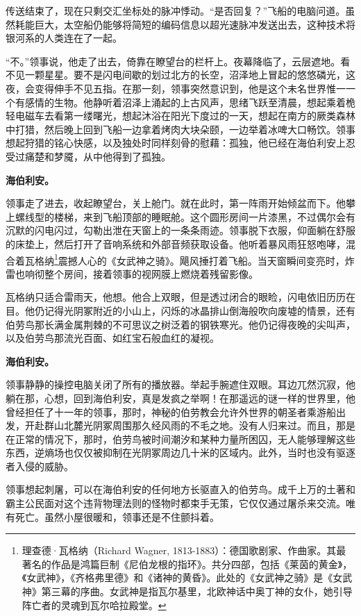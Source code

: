 \documentclass[AutoFakeBold=true]{book}
\begin{document}
传送结束了，现在只剩交汇坐标处的脉冲悸动。``是否回复？''飞船的电脑问道。虽然耗能巨大，太空船仍能够将简短的编码信息以超光速脉冲发送出去，这种技术将银河系的人类连在了一起。

``不。''领事说，他走了出去，倚靠在瞭望台的栏杆上。夜幕降临了，云层遮地。看不见一颗星星。要不是闪电间歇的划过北方的长空，沼泽地上冒起的悠悠磷光，这夜，会变得伸手不见五指。在那一刻，领事突然意识到，他是这个未名世界惟一一个有感情的生物。他静听着沼泽上涌起的上古风声，思绪飞跃至清晨，想起乘着桅轻电磁车去看第一缕曙光，想起沐浴在阳光下度过的一天，想起在南方的厥类森林中打猎，然后晚上回到飞船一边拿着烤肉大块朵颐，一边举着冰啤大口畅饮。领事想起狩猎的铭心快感，以及独处时同样刻骨的慰藉：孤独，他已经在海伯利安上忍受过痛楚和梦魇，从中他得到了孤独。

{\bf \kaishu 海伯利安。}

领事走了进去，收起瞭望台，关上舱门。就在此时，第一阵雨开始倾盆而下。他攀上螺线型的楼梯，来到飞船顶部的睡眠舱。这个圆形房间一片漆黑，不过偶尔会有沉默的闪电闪过，勾勒出泄在天窗上的一条条雨迹。领事脱下衣服，仰面躺在舒服的床垫上，然后打开了音响系统和外部音频获取设备。他听着暴风雨狂怒咆哮，混合着瓦格纳\footnote{理查德·瓦格纳（Richard Wagner, 1813-1883）：德国歌剧家、作曲家。其最著名的作品是鸿篇巨制《尼伯龙根的指环》。共分四部，包括《莱茵的黄金》，《女武神》，《齐格弗里德》和《诸神的黄昏》。此处的《女武神之骑》是《女武神》第三幕的序曲。女武神是指瓦尔基里，北欧神话中奥丁神的女仆，她引导阵亡者的灵魂到瓦尔哈拉殿堂。}震撼人心的《女武神之骑》。飓风捶打着飞船。当天窗瞬间变亮时，炸雷也响彻整个房间，接着领事的视网膜上燃烧着残留影像。

{\kaishu 瓦格纳只适合雷雨天}，他想。他合上双眼，但是透过闭合的眼睑，闪电依旧历历在目。他仍记得光阴冢附近的小山上，闪烁的冰晶排山倒海般吹向废墟的情景，还有伯劳鸟那长满金属荆棘的不可思议之树泛着的钢铁寒光。他仍记得夜晚的尖叫声，以及伯劳鸟那流光百面、如红宝石般血红的凝视。

{\bf \kaishu 海伯利安。}

领事静静的操控电脑关闭了所有的播放器。举起手腕遮住双眼。耳边兀然沉寂，他躺在那，心想，回到海伯利安，真是发疯之举啊！在那遥远的谜一样的世界里，他曾经担任了十一年的领事，那时，神秘的伯劳教会允许外世界的朝圣者乘游船出发，开赴群山北麓光阴冢周围那久经风雨的不毛之地。没有人归来过。而且，那是在正常的情况下，那时，伯劳鸟被时间潮汐和某种力量所困囚，无人能够理解这些东西，逆熵场也仅仅被抑制在光阴冢周边几十米的区域内。此外，当时也没有驱逐者入侵的威胁。

领事想起刺屠，可以在海伯利安的任何地方长驱直入的伯劳鸟。成千上万的土著和霸主公民面对这个违背物理法则的怪物时都束手无策，它仅仅通过屠杀来交流。唯有死亡。虽然小屋很暖和，领事还是不住颤抖着。
\end{document}
